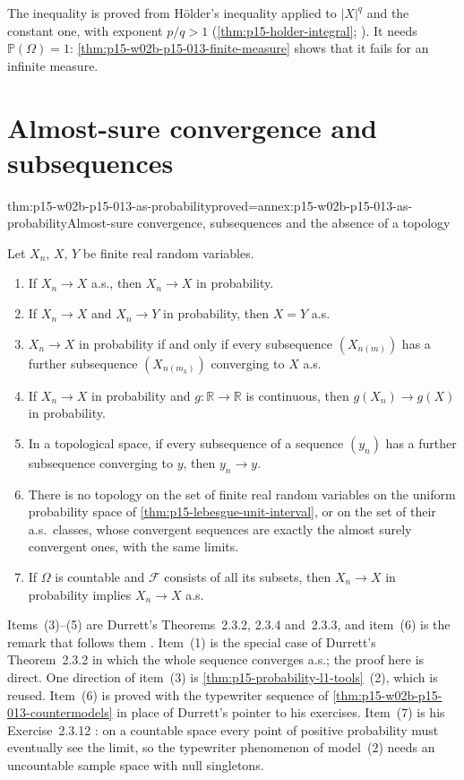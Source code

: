 The inequality is proved from H\"older's inequality applied to
\(|X|^q\) and the constant one, with exponent \(p/q>1\)
(\cref{thm:p15-holder-integral}; \cite[Theorem~1.6.3, p.~29]{DurrettPTEAuthor2019}).
It needs \(\mathbb P(\Omega)=1\): \cref{thm:p15-w02b-p15-013-finite-measure}
shows that it fails for an infinite measure.

\section{Almost-sure convergence and subsequences}
\label{sec:p15-w02b-p15-013-as}

\begin{hbtheorem}{thm:p15-w02b-p15-013-as-probability}{proved=annex:p15-w02b-p15-013-as-probability}{Almost-sure convergence, subsequences and the absence of a topology}
\par\nobreak
Let \(X_n\), \(X\), \(Y\) be finite real random variables.
\begin{enumerate}
\item If \(X_n\to X\) a.s., then \(X_n\to X\) in probability.
\item If \(X_n\to X\) and \(X_n\to Y\) in probability, then \(X=Y\)
      a.s.
\item \(X_n\to X\) in probability if and only if every subsequence
      \((X_{n(m)})\) has a further subsequence \((X_{n(m_k)})\)
      converging to \(X\) a.s.
\item If \(X_n\to X\) in probability and
      \(g:\mathbb R\to\mathbb R\) is continuous, then
      \(g(X_n)\to g(X)\) in probability.
\item In a topological space, if every subsequence of a sequence
      \((y_n)\) has a further subsequence converging to \(y\), then
      \(y_n\to y\).
\item There is no topology on the set of finite real random variables
      on the uniform probability space of
      \cref{thm:p15-lebesgue-unit-interval}, or on the set of their
      a.s.\ classes, whose convergent sequences are exactly the
      almost surely convergent ones, with the same limits.
\item If \(\Omega\) is countable and \(\mathcal F\) consists of all
      its subsets, then \(X_n\to X\) in probability implies
      \(X_n\to X\) a.s.
\end{enumerate}
\end{hbtheorem}

Items~(3)--(5) are Durrett's Theorems~2.3.2, 2.3.4 and~2.3.3, and
item~(6) is the remark that follows them
\cite[pp.~68--69]{DurrettPTEAuthor2019}. Item~(1) is the special case of
Durrett's Theorem~2.3.2 in which the whole sequence converges a.s.;
the proof here is direct. One direction of item~(3) is
\cref{thm:p15-probability-l1-tools}~(2), which is reused. Item~(6)
is proved with the typewriter sequence of
\cref{thm:p15-w02b-p15-013-countermodels} in place of Durrett's
pointer to his exercises. Item~(7) is his Exercise~2.3.12
\cite[p.~75]{DurrettPTEAuthor2019}: on a countable space every point of
positive probability must eventually see the limit, so the typewriter
phenomenon of model~(2) needs an uncountable sample space with
null singletons.


